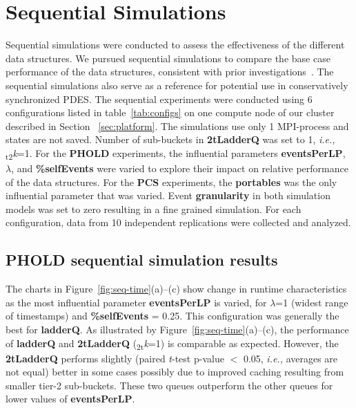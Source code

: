 \section{ \textbf{Sequential Simulations}}\label{sec:seq}

Sequential simulations were conducted to assess the effectiveness of the different data structures. We pursued sequential simulations to compare the base case performance of the data structures, consistent with prior investigations~\cite{tang-05,franceschini-15}. The sequential simulations also serve as a reference for potential use in conservatively synchronized PDES. The sequential experiments were conducted using 6 configurations listed in table~\ref{tab:configs} on one compute node of our cluster described in Section ~\ref{sec:platform}. The simulations use only 1 MPI-process and states are not saved. Number of sub-buckets in \textbf{2tLadderQ} was set to 1, \textit{i.e.,} \textsubscript{t2}\textit{k}=1. For the \textbf{PHOLD} experiments, the influential parameters \textbf{eventsPerLP}, $\lambda$, and \textbf{\%selfEvents} were varied to explore their impact on relative performance of the data structures. For the \textbf{PCS} experiments, the \textbf{portables} was the only influential parameter that was varied. Event \textbf{granularity} in both simulation models was set to zero resulting in a fine grained simulation. For each configuration, data from 10 independent replications were collected and analyzed.

\subsection{ \textbf{PHOLD sequential simulation results}}\label{sec:seq-phold}

The charts in Figure~\ref{fig:seq-time}(a)--(c) show change in runtime characteristics as the most influential parameter \textbf{eventsPerLP} is varied, for $\lambda$=1 (widest range of timestamps) and \textbf{\%self}\-\textbf{Events} = 0.25. This configuration was generally the best for \textbf{ladderQ}. As illustrated by Figure~\ref{fig:seq-time}(a)--(c), the performance of \textbf{ladderQ} and \textbf{2tLadderQ} (\textsubscript{2t}\textit{k}=1) is comparable as expected. However, the \textbf{2tLadderQ} performs slightly (paired \emph{t}-test p-value $<$ 0.05, \textit{i.e.,} averages are not equal) better in some cases possibly due to improved caching resulting from smaller tier-2 sub-buckets. These two queues outperform the other queues for lower values of \textbf{eventsPerLP}.

